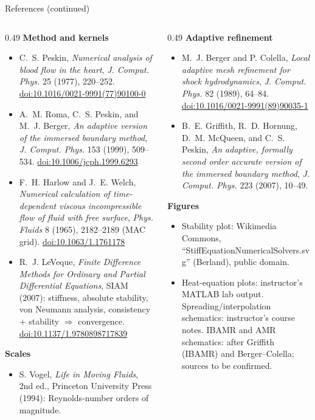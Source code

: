 \documentclass[aspectratio=169,11pt]{beamer}
\begin{document}
\begin{frame}{References (continued)}
\scriptsize
\begin{columns}[T,onlytextwidth]
\begin{column}{0.49\textwidth}
\textbf{Method and kernels}
\begin{itemize}\itemsep3pt
  \item C.~S. Peskin, \emph{Numerical analysis of blood flow in the heart}, \emph{J. Comput. Phys.} 25 (1977), 220--252.
  \href{https://doi.org/10.1016/0021-9991(77)90100-0}{doi:10.1016/0021-9991(77)90100-0}
  \item A.~M. Roma, C.~S. Peskin, and M.~J. Berger, \emph{An adaptive version of the immersed boundary method}, \emph{J. Comput. Phys.} 153 (1999), 509--534.
  \href{https://doi.org/10.1006/jcph.1999.6293}{doi:10.1006/jcph.1999.6293}
  \item F.~H. Harlow and J.~E. Welch, \emph{Numerical calculation of time-dependent viscous incompressible flow of fluid with free surface}, \emph{Phys. Fluids} 8 (1965), 2182--2189 (MAC grid).
  \href{https://doi.org/10.1063/1.1761178}{doi:10.1063/1.1761178}
  \item R.~J. LeVeque, \emph{Finite Difference Methods for Ordinary and Partial Differential Equations}, SIAM (2007): stiffness, absolute stability, von Neumann analysis, consistency + stability \(\Rightarrow\) convergence.
  \href{https://doi.org/10.1137/1.9780898717839}{doi:10.1137/1.9780898717839}
\end{itemize}
\textbf{Scales}
\begin{itemize}\itemsep3pt
  \item S. Vogel, \emph{Life in Moving Fluids}, 2nd ed., Princeton University Press (1994): Reynolds-number orders of magnitude.
\end{itemize}
\end{column}
\begin{column}{0.49\textwidth}
\textbf{Adaptive refinement}
\begin{itemize}\itemsep3pt
  \item M.~J. Berger and P. Colella, \emph{Local adaptive mesh refinement for shock hydrodynamics}, \emph{J. Comput. Phys.} 82 (1989), 64--84.
  \href{https://doi.org/10.1016/0021-9991(89)90035-1}{doi:10.1016/0021-9991(89)90035-1}
  \item B.~E. Griffith, R.~D. Hornung, D.~M. McQueen, and C.~S. Peskin, \emph{An adaptive, formally second order accurate version of the immersed boundary method}, \emph{J. Comput. Phys.} 223 (2007), 10--49.
\end{itemize}
\textbf{Figures}
\begin{itemize}\itemsep3pt
  \item Stability plot: Wikimedia Commons, ``StiffEquationNumericalSolvers.svg'' (Berland), public domain.
  \item Heat-equation plots: instructor's MATLAB lab output. Spreading/interpolation schematics: instructor's course notes. IBAMR and AMR schematics: after Griffith (IBAMR) and Berger--Colella; sources to be confirmed.
\end{itemize}
\end{column}
\end{columns}
\end{frame}
\end{document}
